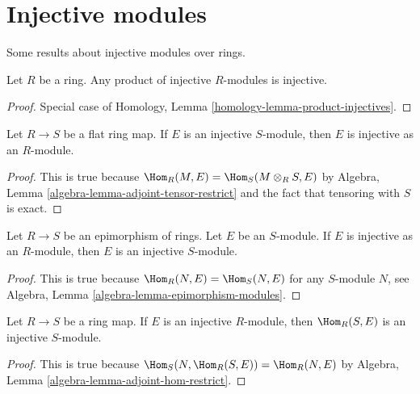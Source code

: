 \section{Injective modules}
\label{section-injective-modules}

\noindent
Some results about injective modules over rings.

\begin{lemma}
\label{lemma-product-injectives}
Let $R$ be a ring. Any product of injective $R$-modules is injective.
\end{lemma}

\begin{proof}
Special case of Homology, Lemma \ref{homology-lemma-product-injectives}.
\end{proof}

\begin{lemma}
\label{lemma-injective-flat}
Let $R \to S$ be a flat ring map. If $E$ is an injective $S$-module,
then $E$ is injective as an $R$-module.
\end{lemma}

\begin{proof}
This is true because $\Hom_R(M, E) = \Hom_S(M \otimes_R S, E)$
by Algebra, Lemma \ref{algebra-lemma-adjoint-tensor-restrict}
and the fact that tensoring with $S$ is exact.
\end{proof}

\begin{lemma}
\label{lemma-injective-epimorphism}
Let $R \to S$ be an epimorphism of rings. Let $E$ be an $S$-module.
If $E$ is injective as an $R$-module, then $E$ is an injective $S$-module.
\end{lemma}

\begin{proof}
This is true because $\Hom_R(N, E) = \Hom_S(N, E)$ for any $S$-module $N$,
see Algebra, Lemma \ref{algebra-lemma-epimorphism-modules}.
\end{proof}

\begin{lemma}
\label{lemma-hom-injective}
Let $R \to S$ be a ring map. If $E$ is an injective $R$-module,
then $\Hom_R(S, E)$ is an injective $S$-module.
\end{lemma}

\begin{proof}
This is true because $\Hom_S(N, \Hom_R(S, E)) = \Hom_R(N, E)$ by
Algebra, Lemma \ref{algebra-lemma-adjoint-hom-restrict}.
\end{proof}


